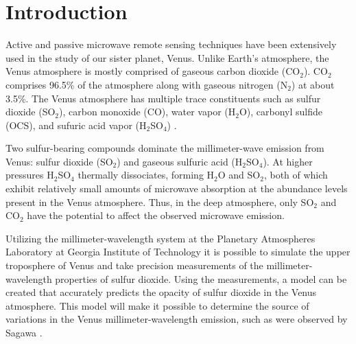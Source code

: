 \section{Introduction}
Active and passive microwave remote sensing techniques have been extensively used in the study of our sister planet, Venus. Unlike Earth's atmosphere, the Venus atmosphere is mostly comprised of gaseous carbon dioxide (CO$_2$). CO$_2$ comprises 96.5\% of the atmosphere along with gaseous nitrogen (N$_2$) at about 3.5\%. The Venus atmosphere has multiple trace constituents such as sulfur dioxide (SO$_2$), carbon monoxide (CO), water vapor (H$_2$O), carbonyl sulfide (OCS), and sufuric acid vapor (H$_2$SO$_4$) \cite{Suleiman-thesis}.

Two sulfur-bearing compounds dominate the millimeter-wave emission from Venus: sulfur dioxide (SO$_2$) and gaseous sulfuric acid (H$_2$SO$_4$). At higher pressures H$_2$SO$_4$ thermally dissociates, forming H$_2$O and SO$_2$, both of which exhibit relatively small amounts of microwave absorption at the abundance levels present in the Venus atmosphere. Thus, in the deep atmosphere, only SO$_2$ and CO$_2$ have the potential to affect the observed microwave emission.

Utilizing the millimeter-wavelength system at the Planetary Atmospheres Laboratory at Georgia Institute of Technology it is possible to simulate the upper troposphere of Venus and take precision measurements of the millimeter-wavelength properties of sulfur dioxide. Using the measurements, a model can be created that accurately predicts the opacity of sulfur dioxide in the Venus atmosphere. This model will make it possible to determine the source of variations in the Venus millimeter-wavelength emission, such as were observed by Sagawa \cite{observations}.